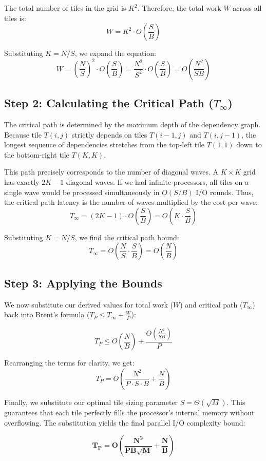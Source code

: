 The total number of tiles in the grid is $K^2$. Therefore, the total work $W$ across all tiles is:
$$W = K^2 \cdot O\left(\frac{S}{B}\right)$$

Substituting $K = N/S$, we expand the equation:
$$W = \left(\frac{N}{S}\right)^2 \cdot O\left(\frac{S}{B}\right) = \frac{N^2}{S^2} \cdot O\left(\frac{S}{B}\right) = O\left(\frac{N^2}{S B}\right)$$

\subsection{Step 2: Calculating the Critical Path ($T_\infty$)}
The critical path is determined by the maximum depth of the dependency graph. Because tile $T(i,j)$ strictly depends on tiles $T(i-1,j)$ and $T(i, j-1)$, the longest sequence of dependencies stretches from the top-left tile $T(1,1)$ down to the bottom-right tile $T(K,K)$.

This path precisely corresponds to the number of diagonal waves. A $K \times K$ grid has exactly $2K - 1$ diagonal waves. If we had infinite processors, all tiles on a single wave would be processed simultaneously in $O(S/B)$ I/O rounds. Thus, the critical path latency is the number of waves multiplied by the cost per wave:
$$T_\infty = (2K - 1) \cdot O\left(\frac{S}{B}\right) = O\left(K \cdot \frac{S}{B}\right)$$

Substituting $K = N/S$, we find the critical path bound:
$$T_\infty = O\left(\frac{N}{S} \cdot \frac{S}{B}\right) = O\left(\frac{N}{B}\right)$$

\subsection{Step 3: Applying the Bounds}
We now substitute our derived values for total work ($W$) and critical path ($T_\infty$) back into Brent's formula ($T_P \le T_\infty + \frac{W}{P}$):

$$T_P \le O\left(\frac{N}{B}\right) + \frac{O\left(\frac{N^2}{S B}\right)}{P}$$

Rearranging the terms for clarity, we get:
$$T_P = O\left( \frac{N^2}{P \cdot S \cdot B} + \frac{N}{B} \right)$$

Finally, we substitute our optimal tile sizing parameter $S = \Theta(\sqrt{M})$. This guarantees that each tile perfectly fills the processor's internal memory without overflowing. The substitution yields the final parallel I/O complexity bound:

$$\mathbf{ T_P = O\left( \frac{N^2}{P B \sqrt{M}} + \frac{N}{B} \right) }$$

